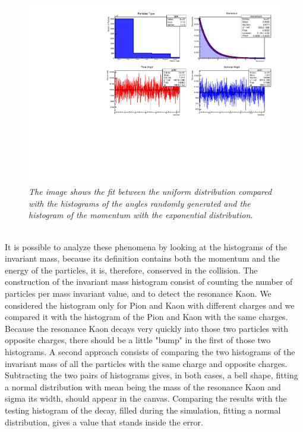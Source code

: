 \documentclass[a4paper, 11pt]{article}
\begin{document}
    \begin{figure}[h!]
      \centering
      \includegraphics[width=.8\linewidth]{can.pdf}
      \caption{\label{f2} \textit{The image shows the fit between the uniform distribution compared with the histograms of the angles randomly generated and the histogram of the momentum with the exponential distribution.}}
    \end{figure}
    \\
    It is possible to analyze these phenomena by looking at the histograms of the invariant mass, because its definition contains both the momentum and the energy of the particles, it is, therefore, conserved in the collision. The construction of the invariant mass histogram consist of counting the number of particles per mass invariant value, and to detect the resonance Kaon. We considered the histogram only for Pion and Kaon with different charges and we compared it with the histogram of the Pion and Kaon with the same charges. Because the resonance Kaon decays very quickly into those two particles with opposite charges, there should be a little "bump" in the first of those two histograms.
    A second approach consists of comparing the two histograms of the invariant mass of all the particles with the same charge and opposite charges.
    \\
    Subtracting the two pairs of histograms gives, in both cases, a bell shape, fitting a normal distribution with mean being the mass of the resonance Kaon and sigma its width, should appear in the canvas. Comparing the results with the testing histogram of the decay, filled during the simulation, fitting a normal distribution, gives a value that stands inside the error.\\
\end{document}
